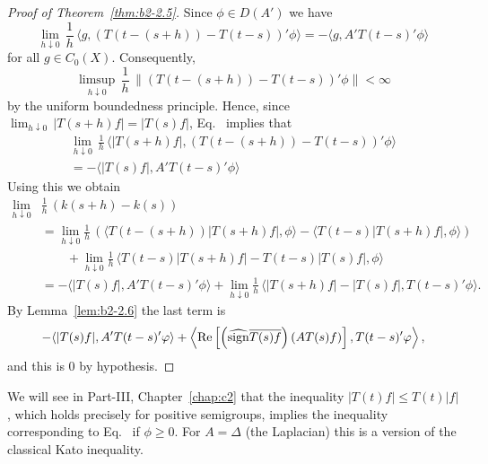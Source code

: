 \begin{proof}[Proof of Theorem~\ref{thm:b2-2.5}]
Since $\phi \in D(A')$ we have
\begin{equation}\label{eq:b2-2.14}
\lim_{h \downarrow 0}\, \frac{1}{h}\, \langle g,(T(t-(s+h)) - T(t-s))'\phi \rangle = - \langle g,A'T(t-s)'\phi \rangle
\end{equation}
for all $g \in C_{0}(X)$.
Consequently,
\begin{equation*}
\limsup_{h \downarrow 0}\, \frac{1}{h}\, \|(T(t-(s+h)) - T(t-s))'\phi\| < \infty
\end{equation*}
by the uniform boundedness principle.
Hence, since $\lim_{h \downarrow 0}\, |T(s+h)f| = |T(s)f|$, Eq.~ implies that
\begin{equation}\label{eq:b2-2.15}
\begin{split}
\lim_{h \downarrow 0}\, \frac{1}{h}\, \langle |T(s+h)f|,(T(t-(s+h)) - T(t-s))'\phi \rangle \\
= - \langle |T(s)f|,A'T(t-s)'\phi \rangle
\end{split}
\end{equation}
Using this we obtain
\begin{align*}
\lim_{h \downarrow 0} & \frac{1}{h}\, (k(s+h) - k(s)) \\
&= \lim_{h \downarrow 0}  \frac{1}{h}\, (\langle T(t-(s+h))|T(s+h)f|,\phi \rangle - \langle T(t-s)|T(s+h)f|,\phi \rangle) \\
&\qquad + \lim_{h \downarrow 0}  \frac{1}{h}\, \langle T(t-s)|T(s+h)f| - T(t-s)|T(s)f|,\phi \rangle \\
&= -\langle |T(s)f|,A'T(t-s)'\phi \rangle + \lim_{h \downarrow 0}  \frac{1}{h} \, \langle |T(s+h)f| - |T(s)f|, T(t-s)'\phi \rangle .
\end{align*}
By Lemma~\ref{lem:b2-2.6} the last term is
\begin{align*}
- \langle |T(s)f|,A'T(t-s)'\phi \rangle + \left\langle \Re\left[\left(\widehat{\sign} \overline{T(s)f}\right)(AT(s)f)\right],T(t-s)'\phi \right\rangle,
\end{align*}
and this is $0$ by hypothesis.
\end{proof}
\begin{remark}\label{rem:b2-2.7}
We will see in Part-III, Chapter~\ref{chap:c2} that the inequality $|T(t)f| \leq T(t)|f|$, which holds precisely for positive semigroups, implies the inequality corresponding to Eq.~
if\/ $\phi \geq 0$.
For $A = \Delta$ (the Laplacian) this is a version of the classical Kato inequality.
\end{remark}
